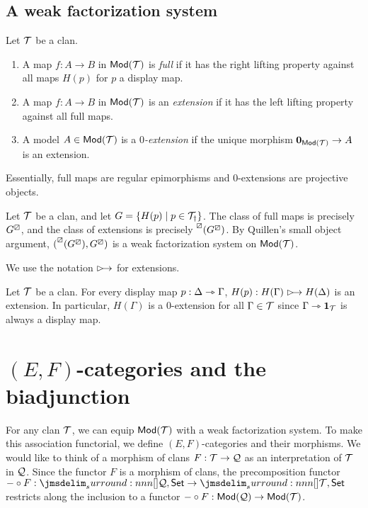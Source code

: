 \documentclass[a4paper]{article}
\begin{document}
\subsection{A weak factorization system}
\begin{definition}
  Let $\mathcal{T}$ be a clan.
  \begin{enumerate}
  \item A map $f : A \to B$ in $\mathsf{Mod}(\mathcal{T})$ is \emph{full} if it has the right lifting property against all maps $H(p)$ for $p$ a display map.
  \item A map $f : A \to B$ in $\mathsf{Mod}(\mathcal{T})$ is an \emph{extension} if it has the left lifting property against all full maps.
  \item A model $A \in \mathsf{Mod}(\mathcal{T})$ is a \emph{$0$-extension} if the unique morphism $\mathbf{0}_{\mathsf{Mod}(\mathcal{T})} \to A$ is an extension.
  \end{enumerate}
\end{definition}

\begin{remark}
  Essentially, full maps are regular epimorphisms and $0$-extensions are projective objects.
\end{remark}

\begin{remark}
  Let $\mathcal{T}$ be a clan, and let $G = \{H(p) \mid p \in \mathcal{T}_{\dag}\}$.
  The class of full maps is precisely $G^{\boxslash}$, and the class of extensions is precisely $\prescript{\boxslash}{}{(G^{\boxslash})}$.
  By Quillen's small object argument, $(\prescript{\boxslash}{}{(G^{\boxslash})},G^{\boxslash})$ is a weak factorization system on $\mathsf{Mod}(\mathcal{T})$.
\end{remark}

\begin{notation}
  We use the notation $\extension$ for extensions.
\end{notation}

\begin{remark}
  Let $\mathcal{T}$ be a clan.
  For every display map $p : \Delta \rightarrowtriangle \Gamma$, $H(p) : H(\Gamma) \extension H(\Delta)$ is an extension.
  In particular, $H(\Gamma)$ is a $0$-extension for all $\Gamma \in \mathcal{T}$ since $\Gamma \rightarrowtriangle \mathbf{1}_{\mathcal{T}}$ is always a display map.
\end{remark}

\section{$(E,F)$-categories and the biadjunction}
For any clan $\mathcal{T}$, we can equip $\mathsf{Mod}(\mathcal{T})$ with a weak factorization system.
To make this association functorial, we define $(E,F)$-categories and their morphisms.
We would like to think of a morphism of clans $F : \mathcal{T} \to \mathcal{Q}$ as an interpretation of $\mathcal{T}$ in $\mathcal{Q}$.
Since the functor $F$ is a morphism of clans, the precomposition functor $- \circ F : \funCat{\cQ}{\Set} \to \funCat{\cT}{\Set}$ restricts along the inclusion to a functor $- \circ F : \mathsf{Mod}(\mathcal{Q}) \to \mathsf{Mod}(\mathcal{T})$.
\end{document}
